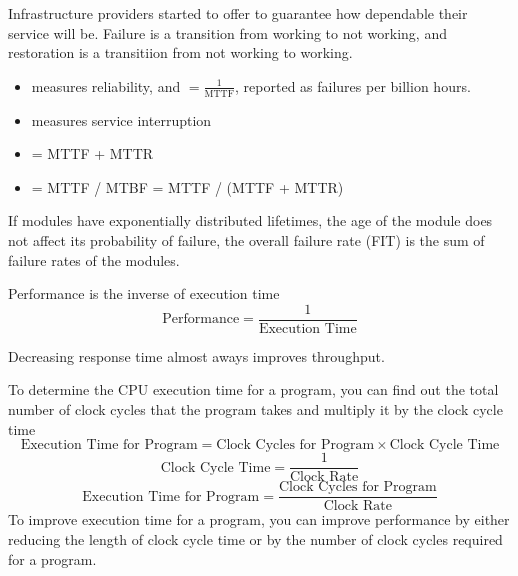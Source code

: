 \documentclass[12pt]{scrartcl}
\begin{document}
\begin{definition}[Dependability]
  Infrastructure providers started to offer  to guarantee 
  how dependable their service will be. Failure is a transition from working to not working, and 
  restoration is a transitiion from not working to working.
\end{definition}

\begin{definition}
  \hfill

  \begin{itemize}
    \item {} measures reliability, and  $ = \frac{1}{\text{MTTF}}$, 
  reported as failures per billion hours. 
    \item {} measures service interruption
    \item {} = MTTF + MTTR
    \item {} = MTTF / MTBF = MTTF / (MTTF + MTTR)
  \end{itemize}
\end{definition}

\begin{note}
  If modules have exponentially distributed lifetimes, the age of the module does not affect 
  its probability of failure, the overall failure rate (FIT) is the sum of failure rates of the modules. 
\end{note}

\begin{definition}[Performance]
  Performance is the inverse of execution time
  \[\text{Performance} = \frac{1}{\text{Execution Time}}\]
\end{definition}

\begin{note}
  Decreasing response time almost aways improves throughput.
\end{note}

\begin{definition}
  To determine the CPU execution time for a program, you can find out the total 
  number of clock cycles that the program takes and multiply it by the clock cycle time
  \[\text{Execution Time for Program} = \text{Clock Cycles for Program} \times \text{Clock Cycle Time}\]
  \[\text{Clock Cycle Time} = \frac{1}{\text{Clock Rate}}\]
  \[\text{Execution Time for Program} = \frac{\text{Clock Cycles for Program}}{\text{Clock Rate}}\]
  To improve execution time for a program, you can improve performance by either reducing the length of clock cycle time 
  or by the number of clock cycles required for a program. 
\end{definition}
\end{document}
